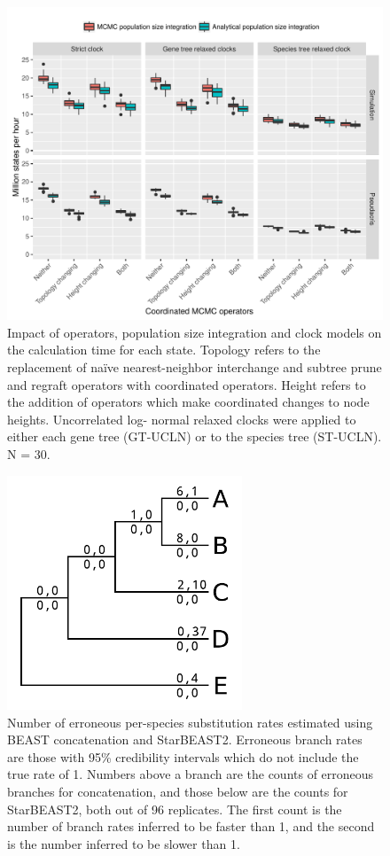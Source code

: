 \documentclass[12pt]{article}
\begin{document}
\begin{figure}[htb!]
\centering
\includegraphics[width=\textwidth]{mstates_per_hour.pdf}
\caption
{Impact of operators, population size integration and clock models on
the calculation time for each state. Topology refers to the
replacement of na\"ive nearest-neighbor interchange and subtree prune and
regraft operators with coordinated operators. Height refers to the addition of
operators which make coordinated changes to node heights. Uncorrelated log-
normal relaxed clocks were applied to either each gene tree (GT-UCLN) or to
the species tree (ST-UCLN). N = 30.}
\label{fig:mstatesPerHour}
\end{figure}

\clearpage

\begin{figure}[htb!]
\centering
\includegraphics[width=7cm]{false_branch_rates.pdf}
\caption
{Number of erroneous per-species substitution rates estimated using BEAST concatenation and StarBEAST2. Erroneous
branch rates are those with 95\% credibility intervals which do not include the true rate of 1.
Numbers above a branch are the counts of erroneous branches for concatenation, and those
below are the counts for StarBEAST2, both out of 96 replicates. The first count is
the number of branch rates inferred to be faster than 1, and the
second is the number inferred to be slower than 1.}
\label{fig:spilsBranchRates}
\end{figure}
\end{document}
